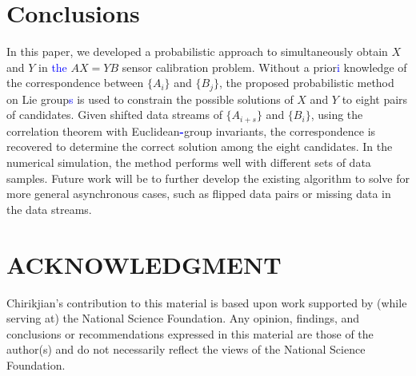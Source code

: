 \documentclass[letterpaper, 10 pt, conference]{ieeeconf}  %
\begin{document}
\section{Conclusions}
\label{sect5}

In this paper, we developed a probabilistic approach to simultaneously obtain $X$ and $Y$ in \textcolor{blue}{the} $AX=YB$ sensor calibration problem. Without a prior\textcolor{blue}{i} knowledge of the correspondence between $\{A_i\}$ and $\{B_j\}$, the proposed probabilistic method on Lie group\textcolor{blue}{s} is used to constrain the possible solutions of $X$ and $Y$ to eight pairs of candidates. Given shifted data streams of $\{A_{i+s}\}$ and $\{B_i\}$, using the correlation theorem with Euclidean\textbf{\textcolor{blue}{-}}group invariants, the correspondence is recovered to determine the correct solution among the eight candidates. In the numerical simulation, the method performs well with different sets of data samples. Future work will be to further develop the existing algorithm to solve for more general asynchronous cases, such as flipped data pairs or missing data in the data streams.


\addtolength{\textheight}{-12cm}   %








\section*{ACKNOWLEDGMENT}
{Chirikjian's contribution to this material is based upon work supported by (while serving at) the National Science Foundation.
Any opinion, findings, and conclusions or recommendations expressed in this material are those of the author(s)
and do not necessarily reflect the views of the National Science Foundation.}






%
%
\end{document}
